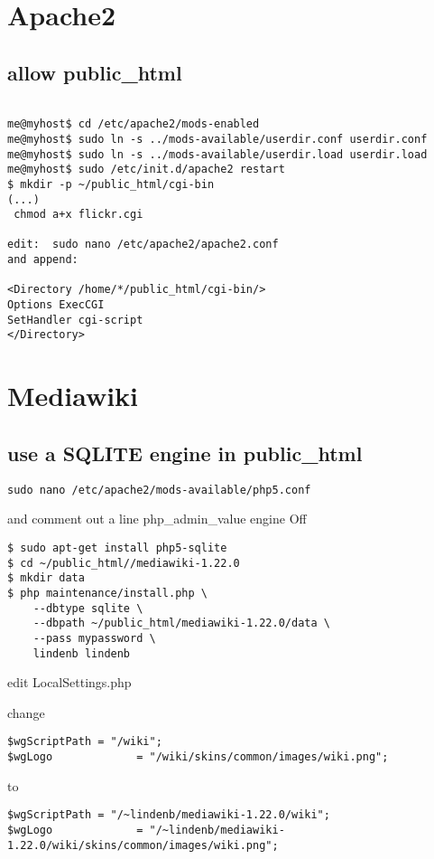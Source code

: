 \documentclass[12pt]{article}
\begin{document}
\section{Apache2}
\subsection{allow public\_html}

\begin{lstlisting}

me@myhost$ cd /etc/apache2/mods-enabled
me@myhost$ sudo ln -s ../mods-available/userdir.conf userdir.conf
me@myhost$ sudo ln -s ../mods-available/userdir.load userdir.load
me@myhost$ sudo /etc/init.d/apache2 restart 
$ mkdir -p ~/public_html/cgi-bin
(...)
 chmod a+x flickr.cgi
 
edit:  sudo nano /etc/apache2/apache2.conf
and append:

<Directory /home/*/public_html/cgi-bin/>
Options ExecCGI
SetHandler cgi-script
</Directory>
\end{lstlisting}

\section{Mediawiki}
\subsection{use a SQLITE engine in public\_html}
\begin{lstlisting}
sudo nano /etc/apache2/mods-available/php5.conf
\end{lstlisting}
and comment out a line php\_admin\_value engine Off

\begin{lstlisting}
$ sudo apt-get install php5-sqlite
$ cd ~/public_html//mediawiki-1.22.0
$ mkdir data
$ php maintenance/install.php \
	--dbtype sqlite \
	--dbpath ~/public_html/mediawiki-1.22.0/data \
	--pass mypassword \
	lindenb lindenb
\end{lstlisting}

edit LocalSettings.php

change
\begin{lstlisting}
$wgScriptPath = "/wiki";
$wgLogo             = "/wiki/skins/common/images/wiki.png";
\end{lstlisting}
to
\begin{lstlisting}
$wgScriptPath = "/~lindenb/mediawiki-1.22.0/wiki";
$wgLogo             = "/~lindenb/mediawiki-1.22.0/wiki/skins/common/images/wiki.png";
\end{lstlisting}
\end{document}
